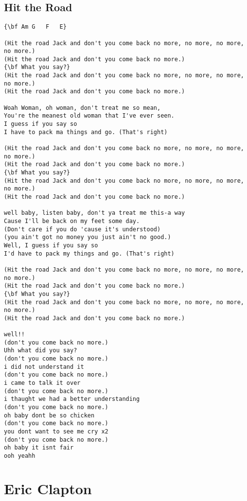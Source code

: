 \documentclass[a4paper]{article}
\begin{document}
\subsection{Hit the Road} %
\label{sub:Hit the Ro}
\begin{Verbatim}[commandchars=\\\{\}]
{\bf Am	G	F	E}

(Hit the road Jack and don't you come back no more, no more, no more, no more.)
(Hit the road Jack and don't you come back no more.)
{\bf What you say?}
(Hit the road Jack and don't you come back no more, no more, no more, no more.)
(Hit the road Jack and don't you come back no more.)

Woah Woman, oh woman, don't treat me so mean,
You're the meanest old woman that I've ever seen.
I guess if you say so
I have to pack ma things and go. (That's right)

(Hit the road Jack and don't you come back no more, no more, no more, no more.)
(Hit the road Jack and don't you come back no more.)
{\bf What you say?}
(Hit the road Jack and don't you come back no more, no more, no more, no more.)
(Hit the road Jack and don't you come back no more.)

well baby, listen baby, don't ya treat me this-a way
Cause I'll be back on my feet some day.
(Don't care if you do 'cause it's understood)
(you ain't got no money you just ain't no good.)
Well, I guess if you say so
I'd have to pack my things and go. (That's right)

(Hit the road Jack and don't you come back no more, no more, no more, no more.)
(Hit the road Jack and don't you come back no more.)
{\bf What you say?}
(Hit the road Jack and don't you come back no more, no more, no more, no more.)
(Hit the road Jack and don't you come back no more.)

well!!
(don't you come back no more.)
Uhh what did you say?
(don't you come back no more.)
i did not understand it
(don't you come back no more.)
i came to talk it over
(don't you come back no more.)
i thaught we had a better understanding
(don't you come back no more.)
oh baby dont be so chicken
(don't you come back no more.)
you dont want to see me cry x2
(don't you come back no more.)
oh baby it isnt fair
ooh yeahh
\end{Verbatim}
\newpage
\section{Eric Clapton} %
\label{sec:Eric Clapto}
\end{document}
